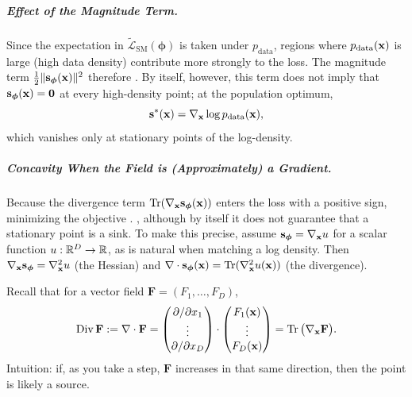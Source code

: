 \subparagraph{Effect of the Magnitude Term.}
Since the expectation in $\widetilde{\mathcal{L}}_{\mathrm{SM}}(\bm\phi)$ is taken under
$p_{\mathrm{data}}$, regions where $p_{\mathrm{data}}({\mathbf{x}})$ is large (high data density)
contribute more strongly to the loss. The magnitude term
$\tfrac12\|{\mathbf{s}}_{\bm\phi}({\mathbf{x}})\|^2$ therefore . By itself, however, this term does not imply that
${\mathbf{s}}_{\bm\phi}({\mathbf{x}})=\mathbf{0}$ at every high-density point; at the population
optimum,
\[
{\mathbf{s}}^*({\mathbf{x}})=\nabla_{{\mathbf{x}}}\log p_{\mathrm{data}}({\mathbf{x}}),
\]
which vanishes only at stationary points of the log-density.

\subparagraph{Concavity When the Field is (Approximately) a Gradient.}
Because the divergence term $\operatorname{Tr}(\nabla_{{\mathbf{x}}} {\mathbf{s}}_{\bm\phi}({\mathbf{x}}))$ enters the loss with a positive sign, minimizing the objective .
, although by itself it does
not guarantee that a stationary point is a sink.
To make this precise, assume
${\mathbf{s}}_{\bm\phi}=\nabla_{{\mathbf{x}}}u$ for a scalar function $u:\mathbb{R}^D\to\mathbb{R}$, as is natural when matching a
log density. Then $\nabla_{{\mathbf{x}}}{\mathbf{s}}_{\bm\phi}=\nabla_{{\mathbf{x}}}^2 u$ (the Hessian) and
$\nabla \cdot {\mathbf{s}}_{\bm\phi}({\mathbf{x}})=\operatorname{Tr}(\nabla_{{\mathbf{x}}}^2 u({\mathbf{x}}))$ (the divergence).
\begin{nknote}
\noindent Recall that for a vector field $\mathbf{F} = (F_1,\ldots,F_D)$,
\[
\mathrm{Div}\,\mathbf{F} := \nabla\cdot\mathbf{F}
= \begin{pmatrix} \partial/\partial x_1 \\ \vdots \\ \partial/\partial x_D \end{pmatrix} \cdot \begin{pmatrix} F_1({\mathbf{x}}) \\ \vdots \\ F_D({\mathbf{x}}) \end{pmatrix}
= \operatorname{Tr}\big(\nabla_{{\mathbf{x}}}\mathbf{F}\big).
\]
Intuition: if, as you take a step, $\mathbf{F}$ increases in that same direction, then the point is likely a source.
\end{nknote}

